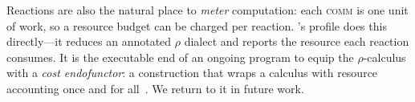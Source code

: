 Reactions are also the natural place to \emph{meter} computation: each
\textsc{comm} is one unit of work, so a resource budget can be charged per
reaction.  \CeTTa{}'s  profile does this directly---it reduces an
annotated $\rho$ dialect and reports the resource each reaction consumes.  It is
the executable end of an ongoing program to equip the $\rho$-calculus with a
\emph{cost endofunctor}: a construction that wraps a calculus with resource
accounting once and for all~\cite{costendofunctor}.  We return to it in future
work.

